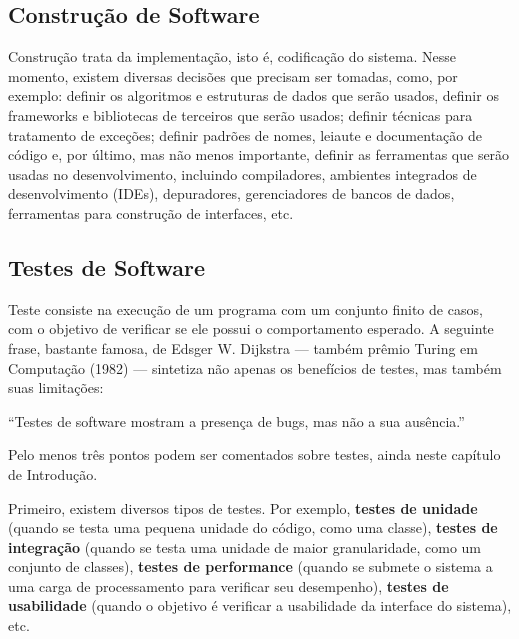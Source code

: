 \documentclass[
  11pt,
  twoside]{book}
\renewenvironment{quote}{\centering \vspace{1.5ex} \begin{tcolorbox}[colback=backcolor, width=4.9in]}{\end{tcolorbox}}
\begin{document}
\hypertarget{construuxe7uxe3o-de-software}{%
\subsection{Construção de Software}\label{construuxe7uxe3o-de-software}}

 Construção trata da implementação, isto
é, codificação do sistema. Nesse momento, existem diversas decisões que
precisam ser tomadas, como, por exemplo: definir os algoritmos e
estruturas de dados que serão usados, definir os frameworks e
bibliotecas de terceiros que serão usados; definir técnicas para
tratamento de exceções; definir padrões de nomes, leiaute e documentação
de código e, por último, mas não menos importante, definir as
ferramentas que serão usadas no desenvolvimento, incluindo compiladores,
ambientes integrados de desenvolvimento (IDEs), depuradores,
gerenciadores de bancos de dados, ferramentas para construção de
interfaces, etc.

\hypertarget{testes-de-software}{%
\subsection{Testes de Software}\label{testes-de-software}}

  Teste consiste na
execução de um programa com um conjunto finito de casos, com o objetivo
de verificar se ele possui o comportamento esperado. A seguinte frase,
bastante famosa, de Edsger W. Dijkstra --- também prêmio Turing em
Computação (1982) --- sintetiza não apenas os benefícios de testes, mas
também suas limitações:

\begin{quote}
``Testes de software mostram a presença de bugs, mas não a sua
ausência.''
\end{quote}

Pelo menos três pontos podem ser comentados sobre testes, ainda neste
capítulo de Introdução.

Primeiro, existem diversos tipos de testes. Por exemplo, \textbf{testes
de unidade} (quando se testa uma pequena unidade do código, como uma
classe), \textbf{testes de integração} (quando se testa uma unidade de
maior granularidade, como um conjunto de classes), \textbf{testes de
performance} (quando se submete o sistema a uma carga de processamento
para verificar seu desempenho), \textbf{testes de usabilidade} (quando o
objetivo é verificar a usabilidade da interface do sistema), etc.
\end{document}

